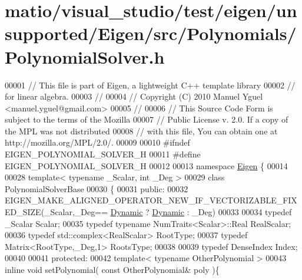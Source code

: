 \hypertarget{matio_2visual__studio_2test_2eigen_2unsupported_2_eigen_2src_2_polynomials_2_polynomial_solver_8h_source}{}\section{matio/visual\+\_\+studio/test/eigen/unsupported/\+Eigen/src/\+Polynomials/\+Polynomial\+Solver.h}
\label{matio_2visual__studio_2test_2eigen_2unsupported_2_eigen_2src_2_polynomials_2_polynomial_solver_8h_source}

\begin{DoxyCode}
00001 \textcolor{comment}{// This file is part of Eigen, a lightweight C++ template library}
00002 \textcolor{comment}{// for linear algebra.}
00003 \textcolor{comment}{//}
00004 \textcolor{comment}{// Copyright (C) 2010 Manuel Yguel <manuel.yguel@gmail.com>}
00005 \textcolor{comment}{//}
00006 \textcolor{comment}{// This Source Code Form is subject to the terms of the Mozilla}
00007 \textcolor{comment}{// Public License v. 2.0. If a copy of the MPL was not distributed}
00008 \textcolor{comment}{// with this file, You can obtain one at http://mozilla.org/MPL/2.0/.}
00009 
00010 \textcolor{preprocessor}{#ifndef EIGEN\_POLYNOMIAL\_SOLVER\_H}
00011 \textcolor{preprocessor}{#define EIGEN\_POLYNOMIAL\_SOLVER\_H}
00012 
00013 \textcolor{keyword}{namespace }\hyperlink{namespace_eigen}{Eigen} \{ 
00014 
00028 \textcolor{keyword}{template}< \textcolor{keyword}{typename} \_Scalar, \textcolor{keywordtype}{int} \_Deg >
00029 \textcolor{keyword}{class }PolynomialSolverBase
00030 \{
00031   \textcolor{keyword}{public}:
00032     EIGEN\_MAKE\_ALIGNED\_OPERATOR\_NEW\_IF\_VECTORIZABLE\_FIXED\_SIZE(\_Scalar,\_Deg==
      \hyperlink{namespace_eigen_ad81fa7195215a0ce30017dfac309f0b2}{Dynamic} ? \hyperlink{namespace_eigen_ad81fa7195215a0ce30017dfac309f0b2}{Dynamic} : \_Deg)
00033 
00034     \textcolor{keyword}{typedef} \_Scalar                             Scalar;
00035     \textcolor{keyword}{typedef} \textcolor{keyword}{typename} NumTraits<Scalar>::Real    RealScalar;
00036     \textcolor{keyword}{typedef} std::complex<RealScalar>            RootType;
00037     \textcolor{keyword}{typedef} Matrix<RootType,\_Deg,1>             RootsType;
00038 
00039     \textcolor{keyword}{typedef} DenseIndex Index;
00040 
00041   \textcolor{keyword}{protected}:
00042     \textcolor{keyword}{template}< \textcolor{keyword}{typename} OtherPolynomial >
00043     \textcolor{keyword}{inline} \textcolor{keywordtype}{void} setPolynomial( \textcolor{keyword}{const} OtherPolynomial& poly )\{

\end{DoxyCode}
